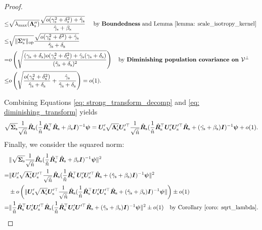 \begin{proof}
\begin{align}
   \nonumber
   \leq &\sqrt{\lambda_{\max}({\bm{\Lambda}}_{\text{s}}'')  }  \frac{ \sqrt{o(\gamma_{\text{s}}^2+\delta_{\text{s}}^2)+\hat{\gamma}_{\text{s}} } }{\hat{\gamma}_{\text{s}}+\beta_{\text{s}}} \quad\text{ by \textbf{Boundedness}{} and Lemma \ref{lemma: scale_isotropy_kernel} } \\
   \nonumber
   \leq &\sqrt{ \lVert  {\bm{\Sigma}}_{\text{s}}''  \rVert_{\mathrm{op}} }  \frac{ \sqrt{o(\gamma_{\text{s}}^2+\delta^2)+\hat{\gamma}_{\text{s}}  } }{\hat{\gamma}_{\text{s}}+\delta_{\text{s}}}  \\
   \nonumber
   = &  o\left( \sqrt{ \frac{(\gamma_{\text{s}}+\delta_{\text{s}} )o(\gamma_{\text{s}}^2+\delta_{\text{s}}^2) + \hat{\gamma}_{\text{s}}(\gamma_{\text{s}}+\delta_{\text{s}})}{ (\hat{\gamma}_{\text{s}}+\delta_{\text{s}})^2 } } \right) \quad\text{by \textbf{Diminishing population covariance on ${\mathcal{V}}^\perp$}{}}\\
   \label{eq: diminishing_transform}
   \leq &   o\left( \sqrt{ \frac{ o(\gamma_{\text{s}}^2+\delta_{\text{s}}^2) }{ \hat{\gamma}_{\text{s}}+\delta_{\text{s}} }+\frac{\hat{\gamma}_{\text{s}}}{ \hat{\gamma}_{\text{s}}+\delta_{\text{s}} } } \right) = o(1).
\end{align}

Combining Equations \ref{eq: strong_transform_decomp} and \ref{eq: diminishing_transform} yields
\begin{align}
    \nonumber
    \sqrt{{\bm{\Sigma}}_{\text{s}}} \frac{1}{\sqrt{\hat{n}}}\hat{{\bm{R}}}_{\text{s}} ( \frac{1}{\hat{n}}\hat{{\bm{R}}}_{\text{s}}^\top \hat{{\bm{R}}}_{\text{s}} +\beta_{\text{s}} {\bm{I}} )^{-1} {\bm{\psi}} = {\bm{U}}_{\text{s}}' \sqrt{{\bm{\Lambda}}_{\text{s}}'} {\bm{U}}_{\text{s}}'^\top  \frac{1}{\sqrt{\hat{n}}}\hat{{\bm{R}}}_{\text{s}}   ( \frac{1}{\hat{n}}\hat{{\bm{R}}}_{\text{s}}^\top{\bm{U}}_{\text{s}}'{\bm{U}}_{\text{s}}'^\top\hat{{\bm{R}}}_{\text{s}} + (\hat{\gamma_{\text{s}}}+\beta_{\text{s}}){\bm{I}}  )^{-1}{\bm{\psi}} + o(1). 
\end{align}
Finally, we consider the squared norm:
\begin{align}
    \nonumber
 & \|  \sqrt{{\bm{\Sigma}}_{\text{s}}} \frac{1}{\sqrt{\hat{n}}}\hat{{\bm{R}}}_{\text{s}} ( \frac{1}{\hat{n}}\hat{{\bm{R}}}_{\text{s}}^\top \hat{{\bm{R}}}_{\text{s}} +\beta_{\text{s}} {\bm{I}} )^{-1} {\bm{\psi}} \|^2 \\
  \nonumber
  = & \| {\bm{U}}_{\text{s}}' \sqrt{{\bm{\Lambda}}_{\text{s}}'} {\bm{U}}_{\text{s}}'^\top  \frac{1}{\sqrt{\hat{n}}}\hat{{\bm{R}}}_{\text{s}}   ( \frac{1}{\hat{n}}\hat{{\bm{R}}}_{\text{s}}^\top{\bm{U}}_{\text{s}}'{\bm{U}}_{\text{s}}'^\top\hat{{\bm{R}}}_{\text{s}} + (\hat{\gamma}_{\text{s}}+\beta_{\text{s}}){\bm{I}}  )^{-1}{\bm{\psi}}\|^2 \\
  \nonumber
  & \pm  o\left(\|{\bm{U}}_{\text{s}}' \sqrt{{\bm{\Lambda}}_{\text{s}}'} {\bm{U}}_{\text{s}}'^\top  \frac{1}{\sqrt{\hat{n}}}\hat{{\bm{R}}}_{\text{s}}   ( \frac{1}{\hat{n}}\hat{{\bm{R}}}_{\text{s}}^\top{\bm{U}}_{\text{s}}'{\bm{U}}_{\text{s}}'^\top\hat{{\bm{R}}}_{\text{s}} + (\hat{\gamma}_{\text{s}}+\beta_{\text{s}}){\bm{I}}  )^{-1}{\bm{\psi}}\|\right) \pm o(1) \\
  \nonumber
  = & \| \frac{1}{\hat{n}}\hat{{\bm{R}}}_{\text{s}}^\top {\bm{U}}_{\text{s}}'{\bm{U}}_{\text{s}}'^\top \hat{{\bm{R}}}_{\text{s}} ( \frac{1}{\hat{n}}\hat{{\bm{R}}}_{\text{s}}^\top{\bm{U}}_{\text{s}}'{\bm{U}}'^\top\hat{{\bm{R}}}_{\text{s}} + (\hat{\gamma}_{\text{s}}+\beta_{\text{s}}){\bm{I}} )^{-1} {\bm{\psi}} \|^2 \pm o(1) \quad\text{by Corollary \ref{coro: sqrt_lambda}}.
\end{align}
\end{proof}

